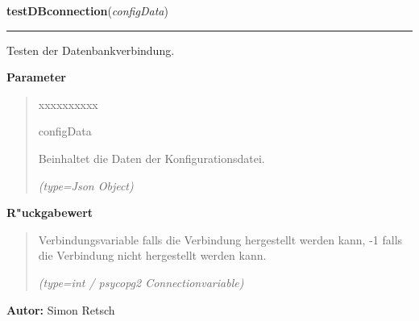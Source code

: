 \hspace{.8\funcindent}\begin{boxedminipage}{\funcwidth}

    \raggedright \textbf{testDBconnection}(\textit{configData})

    \vspace{-1.5ex}

    \rule{\textwidth}{0.5\fboxrule}
\setlength{\parskip}{2ex}
    Testen der Datenbankverbindung.

\setlength{\parskip}{1ex}
      \textbf{Parameter}
      \vspace{-1ex}

      \begin{quote}
        \begin{Ventry}{xxxxxxxxxx}

          \item[configData]

          Beinhaltet die Daten der Konfigurationsdatei.

            {\it (type=Json Object)}

        \end{Ventry}

      \end{quote}

      \textbf{R"uckgabewert}
    \vspace{-1ex}

      \begin{quote}
      Verbindungsvariable falls die Verbindung hergestellt werden kann, -1 
      falls die Verbindung nicht hergestellt werden kann.

      {\it (type=int / psycopg2 Connectionvariable)}

      \end{quote}

\textbf{Autor:} Simon Retsch



    \end{boxedminipage}

    \label{ledleuchtturm:dbFunc:waitForDBupdate}

    \vspace{0.5ex}

